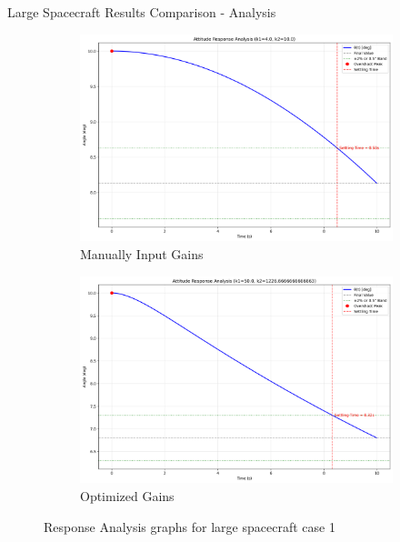\documentclass{beamer}
\begin{document}
\begin{frame}{Large Spacecraft Results Comparison - Analysis}
    \begin{figure}[H]
    \label{Fig. 1}
    \centering
    \begin{subfigure}[b]{0.48\columnwidth}
        \label{Fig. 1.A}
        \centering
        \includegraphics[width=\linewidth]{base_analysis(1).pdf}
        \caption{Manually Input Gains}
        \label{fig:subfig1}
    \end{subfigure}
    \hfill
    \begin{subfigure}[b]{0.48\columnwidth}
        \label{Fig. 1.B}
        \centering
        \includegraphics[width=\linewidth]{best_analysis(1).pdf}
        \caption{Optimized Gains}
        \label{fig:subfig2}
    \end{subfigure}
    \caption{Response Analysis graphs for large spacecraft case 1}
    \label{fig:combined}
\end{figure}
\end{frame}
\end{document}
